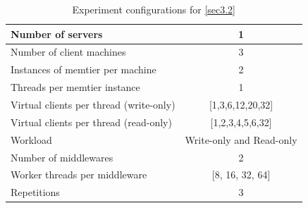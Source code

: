 \documentclass[11pt,a4paper]{article}
\begin{document}
\begin{table}
    \centering
	\begin{tabular}{|l|c|}
		\hline Number of servers                & 1                        \\ 
		\hline Number of client machines        & 3                        \\ 
		\hline Instances of memtier per machine & 2                        \\ 
		\hline Threads per memtier instance     & 1                        \\
		\hline Virtual clients per thread (write-only)  & [1,3,6,12,20,32] \\ 
		\hline Virtual clients per thread (read-only)   & [1,2,3,4,5,6,32] \\ 
		\hline Workload                         & Write-only and Read-only \\
		\hline Number of middlewares            & 2                        \\
		\hline Worker threads per middleware    & [8, 16, 32, 64]          \\
		\hline Repetitions                      & 3                        \\ 
		\hline 
	\end{tabular}
	\caption{Experiment configurations for \autoref{sec3.2}} \label{exp3-2}
\end{table}
\end{document}
